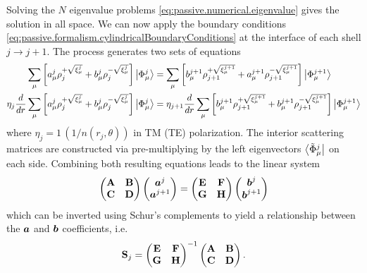 Solving the $N$ eigenvalue problems \eqref{eq:passive.numerical.eigenvalue} gives
the solution in all space. We can now apply the boundary conditions \eqref{eq:passive.formalism.cylindricalBoundaryConditions}
at the interface of each shell $j\rightarrow j+1$. The process generates two sets of equations
  \begin{subequations}
  \begin{align}
   \sum_\mu\left[a_\mu^j\rho_j^{+\sqrt{\xi_\mu^j}}+b_\mu^j\rho_j^{-\sqrt{\xi_\mu^j}}\right]\Ket{\Phi_\mu^j}
   &=
   \sum_\mu\left[b_\mu^{j+1}\rho_{j+1}^{+\sqrt{\xi_\mu^{j+1}}}+a_\mu^{j+1}\rho_{j+1}^{-\sqrt{\xi_\mu^{j+1}}}\right]\Ket{\Phi_\mu^{j+1}}	\\
   \eta_j\frac{d}{dr}\sum_\mu\left[a_\mu^j\rho_j^{+\sqrt{\xi_\mu^j}}+b_\mu^j\rho_j^{-\sqrt{\xi_\mu^j}}\right]\Ket{\Phi_\mu^j}
   &=
   \eta_{j+1}\frac{d}{dr}\sum_\mu\left[b_\mu^{j+1}\rho_{j+1}^{+\sqrt{\xi_\mu^{j+1}}}+b_\mu^{j+1}\rho_{j+1}^{-\sqrt{\xi_\mu^{j+1}}}\right]\Ket{\Phi_\mu^{j+1}}
  \end{align}
  \end{subequations}
where $\eta_j = 1\, (1/n(r_j,\theta))$ in TM (TE) polarization. The interior scattering matrices
are constructed via pre-multiplying by the left eigenvectors $\Bra{\tilde{\Phi}_\mu^j}$ on each side. 
Combining both resulting equations leads to the linear system 
  \begin{equation}
    \begin{pmatrix}\mathbf{A} & \mathbf{B} \\ \mathbf{C} & \mathbf{D} \end{pmatrix} \begin{pmatrix} \boldsymbol{a}^j \\ \boldsymbol{a}^{j+1}\end{pmatrix}
    =
    \begin{pmatrix}\mathbf{E} & \mathbf{F} \\ \mathbf{G} & \mathbf{H} \end{pmatrix} \begin{pmatrix} \boldsymbol{b}^j \\ \boldsymbol{b}^{j+1}\end{pmatrix}
  \end{equation}
which can be inverted using Schur's complements \cite[p.~123]{MEY2001} to yield a relationship between the 
$\boldsymbol{a}$ and $\boldsymbol{b}$ coefficients, i.e.
  \begin{equation}
   \mathbf{S}_j = \begin{pmatrix}\mathbf{E} & \mathbf{F} \\ \mathbf{G} & \mathbf{H} \end{pmatrix}^{-1}\begin{pmatrix}\mathbf{A} & \mathbf{B} \\ \mathbf{C} & \mathbf{D} \end{pmatrix}.
  \end{equation}
